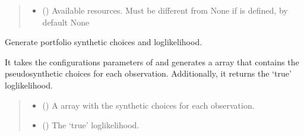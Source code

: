 \documentclass[a4paper,10pt,english]{sphinxhowto}
\begin{document}
\begin{fulllineitems}
\begin{quote}
\begin{description}
\begin{itemize}
\item {} 
\sphinxAtStartPar
{} (\sphinxstyleliteralemphasis{\sphinxupquote{, }}) \textendash{} Available resources. Must be different from None if  is defined,
by default None

\end{itemize}

\end{description}\end{quote}

\begin{fulllineitems}
\label{\detokenize{generated/portchoice.generate:portchoice.generate.PortGen.get_choices}}
\pysigstartsignatures
{}
\pysigstopsignatures
\sphinxAtStartPar
Generate portfolio synthetic choices and log\sphinxhyphen{}likelihood.

\sphinxAtStartPar
It takes the configurations parameters of  and generates
a  array that contains the pseudo\sphinxhyphen{}synthetic choices for
each observation. Additionally, it returns the ‘true’ log\sphinxhyphen{}likelihood.
\begin{quote}\begin{description}
\sphinxAtStartPar
\begin{itemize}
\item {} 
\sphinxAtStartPar
{} () \textendash{} A  array with the synthetic choices for each observation.

\item {} 
\sphinxAtStartPar
{} () \textendash{} The ‘true’ log\sphinxhyphen{}likelihood.

\end{itemize}


\end{description}\end{quote}

\end{fulllineitems}


\end{fulllineitems}
\end{document}
